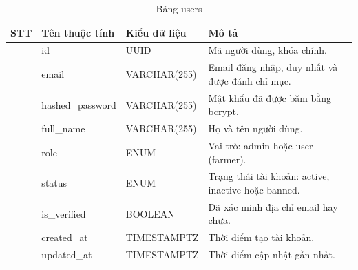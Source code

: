 \documentclass[13pt,a4paper]{extarticle}
\numberwithin{figure}{section}
\numberwithin{table}{section}
\begin{document}
	
	\begin{table}[H]
		\centering
		\caption{Bảng users}
		\label{tab:users}
		\begingroup
		\setlength{\tabcolsep}{3pt}
		\begin{tabularx}{\textwidth}{|>{\centering\arraybackslash}p{1cm}|>{\raggedright\arraybackslash}p{3.8cm}|>{\raggedright\arraybackslash}p{3.2cm}|Y|}
			\hline
			\centering\textbf{STT} & \centering\textbf{Tên thuộc tính} & \centering\textbf{Kiểu dữ liệu} & \centering\arraybackslash\textbf{Mô tả} \\
			 & id & UUID & Mã người dùng, khóa chính. \\
			 & email & VARCHAR(255) & Email đăng nhập, duy nhất và được đánh chỉ mục. \\
			 & hashed\_password & VARCHAR(255) & Mật khẩu đã được băm bằng bcrypt. \\
			 & full\_name & VARCHAR(255) & Họ và tên người dùng. \\
			 & role & ENUM & Vai trò: admin hoặc user (farmer). \\
			 & status & ENUM & Trạng thái tài khoản: active, inactive hoặc banned. \\
			 & is\_verified & BOOLEAN & Đã xác minh địa chỉ email hay chưa. \\
			 & created\_at & TIMESTAMPTZ & Thời điểm tạo tài khoản. \\
			 & updated\_at & TIMESTAMPTZ & Thời điểm cập nhật gần nhất. \\
			\hline
		\end{tabularx}
		\endgroup
	\end{table}
	
\end{document}
